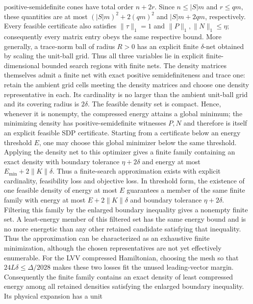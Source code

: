 \begin{lemma}
    positive-semidefinite cones have total order $n+2r$.  Since
    $n\le |S|m$ and $r\le qm$, these quantities are at most
    $(|S|m)^2+2(qm)^2$ and $|S|m+2qm$, respectively.
    Every feasible certificate also satisfies
    $\lVert\tau\rVert_1=1$ and
    $\lVert P\rVert_1,\lVert N\rVert_1\le\eta$; consequently every matrix
    entry obeys the same respective bound.  More generally, a trace-norm
    ball of radius $R>0$ has an explicit finite $\delta$-net obtained by
    scaling the unit-ball grid.  Thus all three variables lie in explicit
    finite-dimensional bounded search regions with finite nets.
    The density matrices themselves admit a finite net with exact positive
    semidefiniteness and trace one: retain the ambient grid cells meeting the
    density matrices and choose one density representative in each.  Its
    cardinality is no larger than the ambient unit-ball grid and its covering
    radius is $2\delta$.
    The feasible density set is compact.  Hence, whenever it is nonempty,
    the compressed energy attains a global minimum; the minimizing density
    has positive-semidefinite witnesses $P,N$ and therefore is itself an
    explicit feasible SDP certificate.  Starting from a certificate below
    an energy threshold $E$, one may choose this global minimizer below the
    same threshold.
    Applying the density net to this optimizer gives a finite family
    containing an exact density with boundary tolerance $\eta+2\delta$ and
    energy at most $E_{\min}+2\lVert K\rVert\delta$.  Thus a finite-search
    approximation exists with explicit cardinality, feasibility loss and
    objective loss.
    In threshold form, the existence of one feasible density of energy at
    most $E$ guarantees a member of the same finite family with energy at
    most $E+2\lVert K\rVert\delta$ and boundary tolerance
    $\eta+2\delta$.
    Filtering this family by the enlarged boundary inequality gives a
    nonempty finite set.  A least-energy member of this filtered set has the
    same energy bound and is no more energetic than any other retained
    candidate satisfying that inequality.  Thus the approximation can be
    characterized as an exhaustive finite minimization, although the chosen
    representatives are not yet effectively enumerable.
    For the LVV compressed Hamiltonian, choosing the mesh so that
    $24L\delta\le\Delta/2028$ makes these two losses fit the unused
    leading-vector margin.  Consequently the finite family contains an exact
    density of least compressed energy among all retained densities satisfying
    the enlarged boundary inequality.  Its physical expansion has a unit

\end{lemma}
